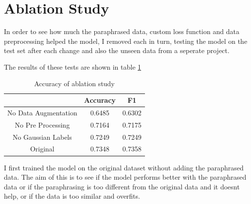 \documentclass{UoYCSproject}
\begin{document}
    \section{Ablation Study}
    In order to see how much the paraphrased data, custom loss function and data preprocessing helped the model, I removed each in turn, testing the model on the test set after each change and also the unseen data from a seperate project.

    The results of these tests are shown in table \ref{tab:accuracy-ablation} \par

\begin{table}[h]
\centering
\begin{tabular}{ccc}
    \toprule

                     & Accuracy   & F1         \\
    \midrule
No Data Augmentation & 0.6485 & 0.6302 \\
No Pre Processing    & 0.7164 & 0.7175 \\
No Gaussian Labels   & 0.7249 & 0.7249 \\
Original             & 0.7348  & 0.7358 \\
    \bottomrule
\end{tabular}
    \caption{Accuracy of ablation study} \label{tab:accuracy-ablation}

\end{table}

    I first trained the model on the original dataset without adding the paraphrased data. The aim of this is to see if the model performs better with the paraphrased data or if the paraphrasing is too different from the original data and it doesnt help, or if the data is too similar and overfits.
\end{document}
